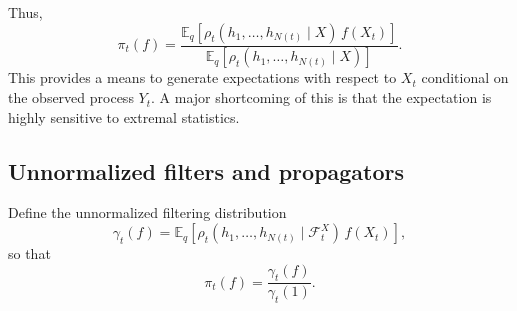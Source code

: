 \documentclass[11pt]{article}
\begin{document}
Thus,
\begin{equation}
\pi_t(f)
=
\frac{
\mathbb E_q\!\left[\rho_t(h_1,\dots,h_{N(t)}\mid X)\,f(X_t)\right]
}{
\mathbb E_q\!\left[\rho_t(h_1,\dots,h_{N(t)}\mid X)\right]
}.
\end{equation}
This provides a means to generate expectations with respect to $X_t$ conditional on the observed process $Y_t$. A major shortcoming of this is that the expectation is highly sensitive to extremal statistics. 

\subsection*{Unnormalized filters and propagators}

Define the unnormalized filtering distribution
\begin{equation}
\gamma_t(f)
=
\mathbb E_q\!\left[\rho_t(h_1,\dots,h_{N(t)}\mid {\mathcal F}_t^X)\,f(X_t)\right],
\end{equation}
so that
\[
\pi_t(f)=\frac{\gamma_t(f)}{\gamma_t(1)}.
\]
\end{document}
